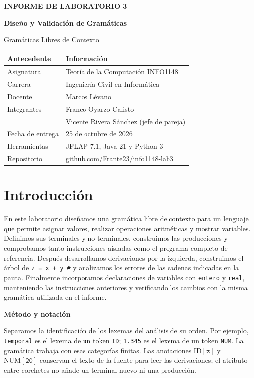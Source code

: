 \documentclass[11pt,letterpaper]{article}
\newcommand{\cod}[1]{\texttt{#1}}
\newcommand{\subtitulo}[1]{\vspace{5pt}\textbf{#1}\par\nopagebreak[4]}
\newcommand{\cab}[1]{\rowcolor{cabecera}#1}
\newcommand{\ID}[1]{\ensuremath{\mathrm{ID}[\texttt{#1}]}}
\newcommand{\NUM}[1]{\ensuremath{\mathrm{NUM}[\texttt{#1}]}}
\newcommand{\repo}{https://github.com/Frante23/info1148-lab3}
\newcommand{\fechaEntrega}{25 de octubre de 2026}
\begin{document}
\begin{center}
{\LARGE\bfseries INFORME DE LABORATORIO 3}\par\vspace{5pt}
{\Large\bfseries Diseño y Validación de Gramáticas}\par
{\large Gramáticas Libres de Contexto}
\end{center}
\vspace{6pt}
\begin{tabularx}{\textwidth}{|p{}|X|}\hline
\cab{\textbf{Antecedente}&\textbf{Información}}\\\hline
Asignatura&Teoría de la Computación INFO1148\\\hline
Carrera&Ingeniería Civil en Informática\\\hline
Docente&Marcos Lévano\\\hline
Integrantes&Franco Oyarzo Calisto\\&Vicente Rivera Sánchez (jefe de pareja)\\\hline
Fecha de entrega&\fechaEntrega\\\hline
Herramientas&JFLAP 7.1, Java 21 y Python 3\\\hline
Repositorio&\href{\repo}{github.com/Frante23/info1148-lab3}\\\hline
\end{tabularx}

\section{Introducción}
En este laboratorio diseñamos una gramática libre de contexto para un lenguaje que permite asignar valores, realizar operaciones aritméticas y mostrar variables. Definimos sus terminales y no terminales, construimos las producciones y comprobamos tanto instrucciones aisladas como el programa completo de referencia. Después desarrollamos derivaciones por la izquierda, construimos el árbol de \cod{z = x + y \#} y analizamos los errores de las cadenas indicadas en la pauta. Finalmente incorporamos declaraciones de variables con \cod{entero} y \cod{real}, manteniendo las instrucciones anteriores y verificando los cambios con la misma gramática utilizada en el informe.

\subtitulo{Método y notación}
Separamos la identificación de los lexemas del análisis de su orden. Por ejemplo, \cod{temporal} es el lexema de un token \cod{ID}; \cod{1.345} es el lexema de un token \cod{NUM}. La gramática trabaja con esas categorías finitas. Las anotaciones \ID{z} y \NUM{20} conservan el texto de la fuente para leer las derivaciones; el atributo entre corchetes no añade un terminal nuevo ni una producción.
\end{document}
